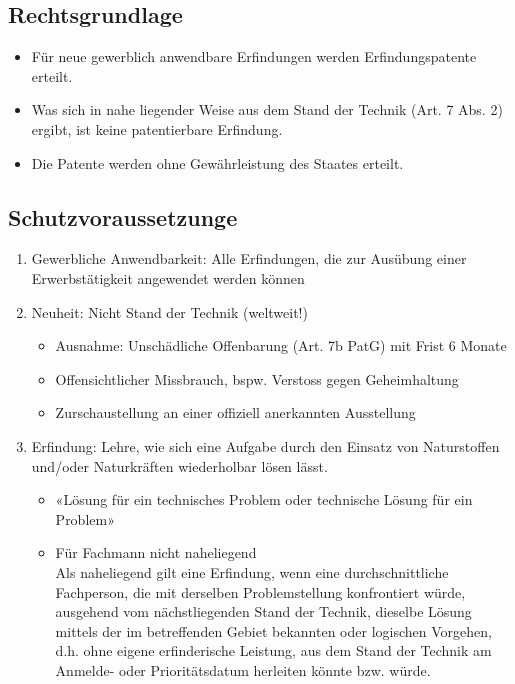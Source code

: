 \hypertarget{rechtsgrundlage-1}{%
\subsection{Rechtsgrundlage}\label{rechtsgrundlage-1}}

\begin{itemize}
\tightlist
\item
  Für neue gewerblich anwendbare Erfindungen werden Erfindungspatente
  erteilt.
\item
  Was sich in nahe liegender Weise aus dem Stand der Technik (Art. 7
  Abs. 2) ergibt, ist keine patentierbare Erfindung.
\item
  Die Patente werden ohne Gewährleistung des Staates erteilt.
\end{itemize}

\hypertarget{schutzvoraussetzunge}{%
\subsection{Schutzvoraussetzunge}\label{schutzvoraussetzunge}}

\begin{enumerate}
\def\labelenumi{\arabic{enumi}.}
\tightlist
\item
  Gewerbliche Anwendbarkeit: Alle Erfindungen, die zur Ausübung einer
  Erwerbstätigkeit angewendet werden können
\item
  Neuheit: Nicht Stand der Technik (weltweit!)

  \begin{itemize}
  \tightlist
  \item
    Ausnahme: Unschädliche Offenbarung (Art. 7b PatG) mit Frist 6 Monate
  \item
    Offensichtlicher Missbrauch, bspw. Verstoss gegen Geheimhaltung
  \item
    Zurschaustellung an einer offiziell anerkannten Ausstellung
  \end{itemize}
\item
  Erfindung: Lehre, wie sich eine Aufgabe durch den Einsatz von
  Naturstoffen und/oder Naturkräften wiederholbar lösen lässt.

  \begin{itemize}
  \tightlist
  \item
    «Lösung für ein technisches Problem oder technische Lösung für ein
    Problem»
  \item
    Für Fachmann nicht naheliegend\\
    Als naheliegend gilt eine Erfindung, wenn eine durchschnittliche
    Fachperson, die mit derselben Problemstellung konfrontiert würde,
    ausgehend vom nächstliegenden Stand der Technik, dieselbe Lösung
    mittels der im betreffenden Gebiet bekannten oder logischen
    Vorgehen, d.h. ohne eigene erfinderische Leistung, aus dem Stand der
    Technik am Anmelde- oder Prioritätsdatum herleiten könnte bzw.
    würde.
  \end{itemize}
\end{enumerate}

